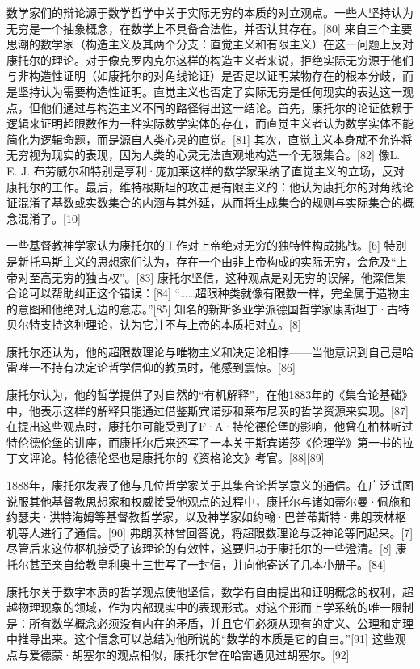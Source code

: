 数学家们的辩论源于数学哲学中关于实际无穷的本质的对立观点。一些人坚持认为无穷是一个抽象概念，在数学上不具备合法性，并否认其存在。[80] 来自三个主要思潮的数学家（构造主义及其两个分支：直觉主义和有限主义）在这一问题上反对康托尔的理论。对于像克罗内克尔这样的构造主义者来说，拒绝实际无穷源于他们与非构造性证明（如康托尔的对角线论证）是否足以证明某物存在的根本分歧，而是坚持认为需要构造性证明。直觉主义也否定了实际无穷是任何现实的表达这一观点，但他们通过与构造主义不同的路径得出这一结论。首先，康托尔的论证依赖于逻辑来证明超限数作为一种实际数学实体的存在，而直觉主义者认为数学实体不能简化为逻辑命题，而是源自人类心灵的直觉。[81] 其次，直觉主义本身就不允许将无穷视为现实的表现，因为人类的心灵无法直观地构造一个无限集合。[82] 像L. E. J. 布劳威尔和特别是亨利·庞加莱这样的数学家采纳了直觉主义的立场，反对康托尔的工作。最后，维特根斯坦的攻击是有限主义的：他认为康托尔的对角线论证混淆了基数或实数集合的内涵与其外延，从而将生成集合的规则与实际集合的概念混淆了。[10]

一些基督教神学家认为康托尔的工作对上帝绝对无穷的独特性构成挑战。[6] 特别是新托马斯主义的思想家们认为，存在一个由非上帝构成的实际无穷，会危及“上帝对至高无穷的独占权”。[83] 康托尔坚信，这种观点是对无穷的误解，他深信集合论可以帮助纠正这个错误：[84] “……超限种类就像有限数一样，完全属于造物主的意图和他绝对无边的意志。”[85] 知名的新斯多亚学派德国哲学家康斯坦丁·古特贝尔特支持这种理论，认为它并不与上帝的本质相对立。[8]

康托尔还认为，他的超限数理论与唯物主义和决定论相悖——当他意识到自己是哈雷唯一不持有决定论哲学信仰的教员时，他感到震惊。[86]

康托尔认为，他的哲学提供了对自然的“有机解释”，在他1883年的《集合论基础》中，他表示这样的解释只能通过借鉴斯宾诺莎和莱布尼茨的哲学资源来实现。[87] 在提出这些观点时，康托尔可能受到了F·A·特伦德伦堡的影响，他曾在柏林听过特伦德伦堡的讲座，而康托尔后来还写了一本关于斯宾诺莎《伦理学》第一书的拉丁文评论。特伦德伦堡也是康托尔的《资格论文》考官。[88][89]

1888年，康托尔发表了他与几位哲学家关于其集合论哲学意义的通信。在广泛试图说服其他基督教思想家和权威接受他观点的过程中，康托尔与诸如蒂尔曼·佩施和约瑟夫·洪特海姆等基督教哲学家，以及神学家如约翰·巴普蒂斯特·弗朗茨林枢机等人进行了通信。[90] 弗朗茨林曾回答说，将超限数理论与泛神论等同起来。[7] 尽管后来这位枢机接受了该理论的有效性，这要归功于康托尔的一些澄清。[8] 康托尔甚至亲自给教皇利奥十三世写了一封信，并向他寄送了几本小册子。[84]

康托尔关于数字本质的哲学观点使他坚信，数学有自由提出和证明概念的权利，超越物理现象的领域，作为内部现实中的表现形式。对这个形而上学系统的唯一限制是：所有数学概念必须没有内在的矛盾，并且它们必须从现有的定义、公理和定理中推导出来。这个信念可以总结为他所说的“数学的本质是它的自由。”[91] 这些观点与爱德蒙·胡塞尔的观点相似，康托尔曾在哈雷遇见过胡塞尔。[92]


